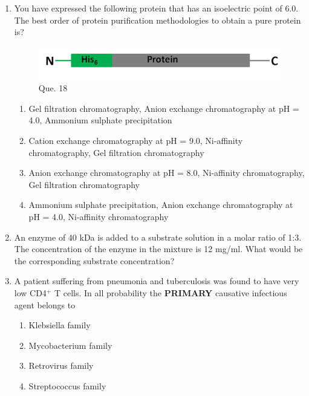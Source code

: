 \documentclass[journal]{IEEEtran}
\begin{document}
\begin{enumerate}
\item You have expressed the following protein that has an isoelectric point of 6.0. The best order of protein purification methodologies to obtain a pure protein is?\hfill  \textit{}
\begin{figure}
    \centering
    \includegraphics[width=0.5\columnwidth]{figs/Screenshot 2025-08-05 123543.png}
    \caption{Que. 18}
\end{figure}
\begin{enumerate}
    \item Gel filtration chromatography, Anion exchange chromatography at pH = 4.0, Ammonium sulphate precipitation
    \item Cation exchange chromatography at pH = 9.0, Ni-affinity chromatography, Gel filtration chromatography
    \item Anion exchange chromatography at pH = 8.0, Ni-affinity chromatography, Gel filtration chromatography
    \item Ammonium sulphate precipitation, Anion exchange chromatography at pH = 4.0, Ni-affinity chromatography
\end{enumerate}

\item An enzyme of 40 kDa is added to a substrate solution in a molar ratio of 1:3. The concentration of the enzyme in the mixture is 12 mg/ml. What would be the corresponding substrate concentration?\hfill  \textit{}
\begin{enumerate}
\end{enumerate}

\item A patient suffering from pneumonia and tuberculosis was found to have very low CD4$^+$ T cells. In all probability the \textbf{PRIMARY} causative infectious agent belongs to\hfill  \textit{}
\begin{enumerate}
    \item Klebsiella family
    \item Mycobacterium family
    \item Retrovirus family
    \item Streptococcus family
\end{enumerate}


\end{enumerate}
\end{document}
